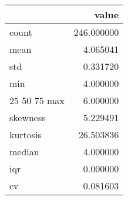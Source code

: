 \begin{tabular}{lr}
\toprule
 & value \\
\midrule
count & 246.000000 \\
mean & 4.065041 \\
std & 0.331720 \\
min & 4.000000 \\
25%
50%
75%
max & 6.000000 \\
skewness & 5.229491 \\
kurtosis & 26.503836 \\
median & 4.000000 \\
iqr & 0.000000 \\
cv & 0.081603 \\
\bottomrule
\end{tabular}
